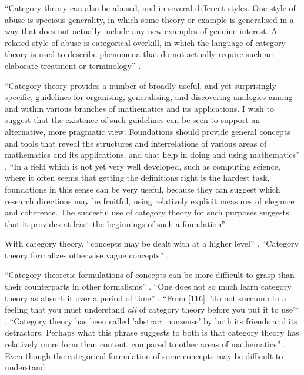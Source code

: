 

``Category theory can also be abused, and in several different styles.
One style of abuse is specious generality, in which some theory or
example is generalised in a way that does not actually include any new
examples of genuine interest. A related style of abuse is categorical
overkill, in which the language of category theory is used to describe
phenomena that do not actually require such an elaborate treatment or
terminology'' \parencite[50]{goguen-1991}.

``Category theory provides a number of broadly useful, and yet
surprisingly specific, guidelines for organising, generalising, and
discovering analogies among and within various branches of mathematics
and its applications. I wish to suggest that the existence of such
guidelines can be seen to support an alternative, more pragmatic view:
Foundations should provide general concepts and tools that reveal the
structures and interrelations of various areas of mathematics and its
applications, and that help in doing and using mathematics''
\parencite[64]{goguen-1991}. ``In a field which is not yet very well
developed, such as computing science, where it often seems that
getting the definitions right is the hardest task, foundations in this
sense can be very useful, because they can suggest which research
directions may be fruitful, using relatively explicit measures of
elegance and coherence. The succesful use of category theory for such
purposes suggests that it provides at least the beginnings of such a
foundation'' \parencite[64]{goguen-1991}.

With category theory, ``concepts may be dealt with at a higher level''
\parencite[xi]{pierce-1991}. ``Category theory formalizes otherwise
vague concepts'' \parencite[414]{poigne-1992}.

``Category-theoretic formulations of concepts can be more difficult to
grasp than their counterparts in other formalisms''
\parencite[xi]{pierce-1991}. ``One does not so much learn category
theory as absorb it over a period of time''
\parencite[25]{bird-demoor-1997}. ``From [116]: 'do not succumb to a
feeling that you must understand \emph{all} of category theory before
you put it to use'`` \parencite[xi]{pierce-1991}. ``Category theory
has been called 'abstract nonsense' by both its friends and its
detractors. Perhaps what this phrase suggests to both is that category
theory has relatively more form than content, compared to other areas
of mathematics'' \parencite[50]{goguen-1991}. Even though the
categorical formulation of some concepts may be difficult to
understand.

